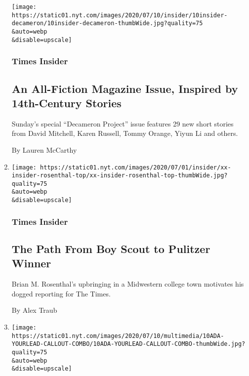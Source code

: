 \begin{enumerate}
  \texttt{[image: https://static01.nyt.com/images/2020/07/10/insider/10insider-decameron/10insider-decameron-thumbWide.jpg?quality=75\\\&auto=webp\\\&disable=upscale]}

  \hypertarget{times-insider-9}{%
  \subsubsection{Times Insider}\label{times-insider-9}}

  \hypertarget{an-all-fiction-magazine-issue-inspired-by-14th-century-stories}{%
  \subsection{An All-Fiction Magazine Issue, Inspired by 14th-Century
  Stories}\label{an-all-fiction-magazine-issue-inspired-by-14th-century-stories}}

  Sunday's special ``Decameron Project'' issue features 29 new short
  stories from David Mitchell, Karen Russell, Tommy Orange, Yiyun Li and
  others.

  By Lauren McCarthy
\item
  \href{/2020/07/10/insider/brian-rosenthal-pulitzer.html}{}

  \texttt{[image: https://static01.nyt.com/images/2020/07/01/insider/xx-insider-rosenthal-top/xx-insider-rosenthal-top-thumbWide.jpg?quality=75\\\&auto=webp\\\&disable=upscale]}

  \hypertarget{times-insider-10}{%
  \subsubsection{Times Insider}\label{times-insider-10}}

  \hypertarget{the-path-from-boy-scout-to-pulitzer-winner}{%
  \subsection{The Path From Boy Scout to Pulitzer
  Winner}\label{the-path-from-boy-scout-to-pulitzer-winner}}

  Brian M. Rosenthal's upbringing in a Midwestern college town motivates
  his dogged reporting for The Times.

  By Alex Traub
\item
  \href{/2020/07/10/reader-center/disability-america-questions.html}{}

  \texttt{[image: https://static01.nyt.com/images/2020/07/10/multimedia/10ADA-YOURLEAD-CALLOUT-COMBO/10ADA-YOURLEAD-CALLOUT-COMBO-thumbWide.jpg?quality=75\\\&auto=webp\\\&disable=upscale]}


\end{enumerate}
